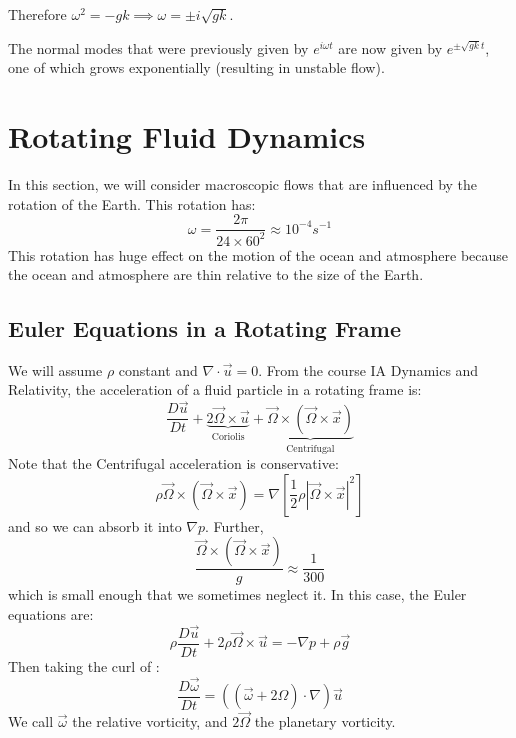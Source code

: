 \documentclass[../Main.tex]{subfiles}
\begin{document}
Therefore $\omega^2 = -gk \implies \omega = \pm i\sqrt{gk}$.

The normal modes that were previously given by $e^{i\omega t}$ are now given by $e^{\pm \sqrt{gk}t}$, one of which grows exponentially (resulting in unstable flow).
\section{Rotating Fluid Dynamics}
In this section, we will consider macroscopic flows that are influenced by the rotation of the Earth. This rotation has:
\begin{equation*}
    \omega = \frac{2\pi}{24 \times 60^2} \approx 10^{-4} s^{-1}
\end{equation*}
This rotation has huge effect on the motion of the ocean and atmosphere because the ocean and atmosphere are thin relative to the size of the Earth.
\subsection{Euler Equations in a Rotating Frame}
We will assume $\rho$ constant and $\nabla \cdot \vec{u} = 0$. From the course IA Dynamics and Relativity, the acceleration of a fluid particle in a rotating frame is:
\begin{equation*}
    \frac{D \vec{u}}{D t} + \underbrace{2 \vec{\Omega} \times \vec{u}}_{\text{Coriolis}} + \underbrace{\vec{\Omega} \times \left(\vec{\Omega} \times \vec{x}\right)}_{\text{Centrifugal}}
\end{equation*}
Note that the Centrifugal acceleration is conservative:
\begin{equation*}
    \rho \vec{\Omega} \times \left(\vec{\Omega} \times \vec{x}\right) = \nabla \left[\frac12 \rho |\vec{\Omega} \times \vec{x}|^2\right]
\end{equation*}
and so we can absorb it into $\nabla p$. Further,
\begin{equation*}
    \frac{\vec{\Omega} \times \left(\vec{\Omega} \times \vec{x}\right)}{g} \approx \frac{1}{300}
\end{equation*}
which is small enough that we sometimes neglect it. In this case, the Euler equations are:
\begin{equation}
    \rho \frac{D \vec{u}}{D t} + 2\rho \vec{\Omega} \times \vec{u} = -\nabla p + \rho \vec{g}
    \label{eqnEulerMomRotating}
\end{equation}
Then taking the curl of :
\begin{equation*}
    \frac{D \vec{\omega}}{D t} = ((\vec{\omega} + 2 \Omega) \cdot \nabla) \vec{u}
\end{equation*}
We call $\vec{\omega}$ the relative vorticity, and $2\vec{\Omega}$ the planetary vorticity.
\end{document}
